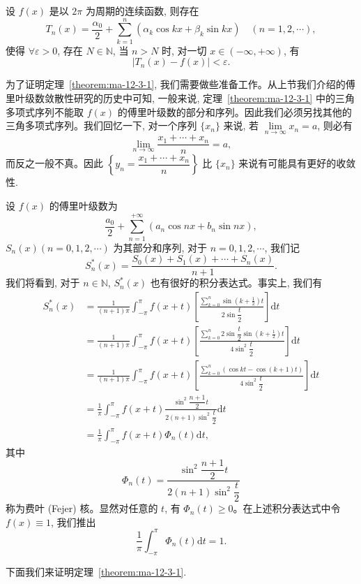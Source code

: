 \begin{theorem}[{魏尔斯特拉斯第二逼近定理}]\label{theorem:ma-12-3-1}
设 $f(x)$ 是以 $2\pi$ 为周期的连续函数, 则存在
\[
  T_n(x)=\frac{\alpha_0}{2}+\sum_{k=1}^n(\alpha_k\cos kx+\beta_k\sin kx)\quad(n=1,2,\cdots),
\]
使得 $\forall\varepsilon>0$, 存在 $N\in\mathbb N$, 当 $n>N$ 时, 对一切 $x\in(-\infty,+\infty)$, 有
\[
  |T_n(x)-f(x)|<\varepsilon.
\]
\end{theorem}

为了证明定理~\ref{theorem:ma-12-3-1}, 我们需要做些准备工作。从上节我们介绍的傅里叶级数敛散性研究的历史中可知, 一般来说, 定理~\ref{theorem:ma-12-3-1} 中的三角多项式序列不能取 $f(x)$ 的傅里叶级数的部分和序列。因此我们必须另找其他的三角多项式序列。我们回忆一下, 对一个序列 $\{x_n\}$ 来说, 若 $\lim\limits_{n\to\infty}x_n=a$, 则必有
\[
  \lim_{n\to\infty}\frac{x_1+\cdots+x_n}{n}=a,
\]
而反之一般不真。因此 $\left\{y_n=\dfrac{x_1+\cdots+x_n}{n}\right\}$ 比 $\{x_n\}$ 来说有可能具有更好的收敛性.

设 $f(x)$ 的傅里叶级数为
\[
  \frac{a_0}{2}+\sum_{n=1}^{+\infty}(a_n\cos nx+b_n\sin nx),
\]
$S_n(x)(n=0,1,2,\cdots)$ 为其部分和序列, 对于 $n=0,1,2,\cdots$, 我们记
\[
  S_n^*(x)=\frac{S_0(x)+S_1(x)+\cdots+S_n(x)}{n+1}.
\]
我们将看到, 对于 $n\in\mathbb N$, $S_n^*(x)$ 也有很好的积分表达式。事实上, 我们有
\[
\begin{aligned}
  S_n^*(x)
  &=\frac{1}{(n+1)\pi}\int_{-\pi}^{\pi}f(x+t)
    \left[
      \frac{\displaystyle\sum_{k=0}^n\sin\left(k+\frac12\right)t}{2\sin\dfrac t2}
    \right]\mathrm dt\\
  &=\frac{1}{(n+1)\pi}\int_{-\pi}^{\pi}f(x+t)
    \left[
      \frac{\displaystyle\sum_{k=0}^n2\sin\dfrac t2\sin\left(k+\frac12\right)t}{4\sin^2\dfrac t2}
    \right]\mathrm dt\\
  &=\frac{1}{(n+1)\pi}\int_{-\pi}^{\pi}f(x+t)
    \left[
      \frac{\displaystyle\sum_{k=0}^n(\cos kt-\cos(k+1)t)}{4\sin^2\dfrac t2}
    \right]\mathrm dt\\
  &=\frac1\pi\int_{-\pi}^{\pi}f(x+t)
    \frac{\sin^2\dfrac{n+1}{2}t}{2(n+1)\sin^2\dfrac t2}\mathrm dt\\
  &=\frac1\pi\int_{-\pi}^{\pi}f(x+t)\Phi_n(t)\mathrm dt,
\end{aligned}
\]
其中
\[
  \Phi_n(t)=\frac{\sin^2\dfrac{n+1}{2}t}{2(n+1)\sin^2\dfrac t2}
\]
称为费叶 (Fejer) 核。显然对任意的 $t$, 有 $\Phi_n(t)\geqslant0$。在上述积分表达式中令 $f(x)\equiv1$, 我们推出
\[
  \frac1\pi\int_{-\pi}^{\pi}\Phi_n(t)\mathrm dt=1.
\]

下面我们来证明定理~\ref{theorem:ma-12-3-1}.

